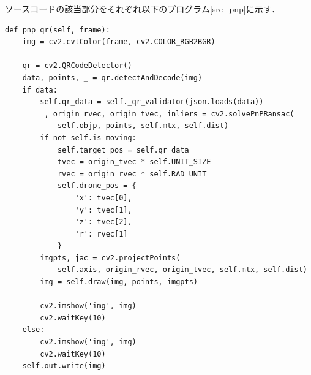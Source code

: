 ソースコードの該当部分をそれぞれ以下のプログラム\ref{src_pnp}に示す．
\begin{lstlisting}[caption=pnp method,label=src_pnp]
def pnp_qr(self, frame):                                                    
    img = cv2.cvtColor(frame, cv2.COLOR_RGB2BGR)                            
                                                                            
    qr = cv2.QRCodeDetector()
    data, points, _ = qr.detectAndDecode(img)
    if data:                                                                
        self.qr_data = self._qr_validator(json.loads(data))
        _, origin_rvec, origin_tvec, inliers = cv2.solvePnPRansac(
            self.objp, points, self.mtx, self.dist)
        if not self.is_moving:
            self.target_pos = self.qr_data
            tvec = origin_tvec * self.UNIT_SIZE
            rvec = origin_rvec * self.RAD_UNIT
            self.drone_pos = {
                'x': tvec[0],                                               
                'y': tvec[1],                                               
                'z': tvec[2],                                               
                'r': rvec[1]                                                
            }                                                               
        imgpts, jac = cv2.projectPoints(
            self.axis, origin_rvec, origin_tvec, self.mtx, self.dist)
        img = self.draw(img, points, imgpts)
                                                                            
        cv2.imshow('img', img)
        cv2.waitKey(10)             
    else:                                                                   
        cv2.imshow('img', img)                                              
        cv2.waitKey(10)                                                     
    self.out.write(img) 
\end{lstlisting}
